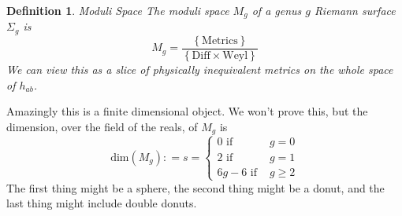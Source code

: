 \documentclass[11pt, oneside]{article}   	%
\theoremstyle{slanted}
\newtheorem*{defn}{Definition}
\begin{document}
\begin{defn}{Moduli Space}
The moduli space $ M _ g $ of a genus $ g $ Riemann surface 
$ \Sigma_ g $ is 
\[
 M _ g  = \frac{\left\{  \text{Metrics} \right\} }{\left\{  \text{Diff} \times \text{Weyl}  \right\} }
\] We can view this 
as a slice of physically inequivalent metrics 
on the whole space of $ h _{ ab } $. 	
\end{defn}
Amazingly 
this is a finite dimensional object. 
We won't prove this, but the dimension, over the field of the 
reals, of $ M _ g $ is 
\[
	\text{dim}\left( M _ g  \right)  : = s  = \begin{cases}
		0 \text{ if } & g  = 0 \\
		2 \text{ if } & g  = 1 \\
		6g  - 6 \text{ if } & g \geq 2 
	\end{cases}
\] The first thing might be 
a sphere, the second thing might be a donut, 
and the last thing might include double donuts. 
\end{document}
